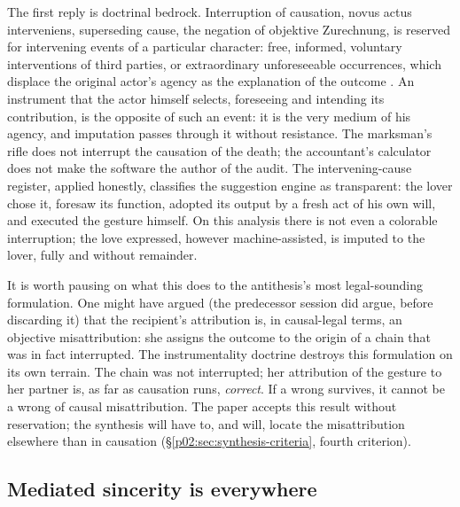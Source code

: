 \documentclass[11pt,a4paper]{article}
\begin{document}
The first reply is doctrinal bedrock. Interruption of causation, novus actus interveniens, superseding cause, the negation of objektive Zurechnung, is reserved for intervening events of a particular character: free, informed, voluntary interventions of third parties, or extraordinary unforeseeable occurrences, which displace the original actor's agency as the explanation of the outcome \parencite{hart1985causation,roxin2006strafrecht}. An instrument that the actor himself selects, foreseeing and intending its contribution, is the opposite of such an event: it is the very medium of his agency, and imputation passes through it without resistance. The marksman's rifle does not interrupt the causation of the death; the accountant's calculator does not make the software the author of the audit. The intervening-cause register, applied honestly, classifies the suggestion engine as transparent: the lover chose it, foresaw its function, adopted its output by a fresh act of his own will, and executed the gesture himself. On this analysis there is not even a colorable interruption; the love expressed, however machine-assisted, is imputed to the lover, fully and without remainder.

It is worth pausing on what this does to the antithesis's most legal-sounding formulation. One might have argued (the predecessor session did argue, before discarding it) that the recipient's attribution is, in causal-legal terms, an objective misattribution: she assigns the outcome to the origin of a chain that was in fact interrupted. The instrumentality doctrine destroys this formulation on its own terrain. The chain was not interrupted; her attribution of the gesture to her partner is, as far as causation runs, \emph{correct}. If a wrong survives, it cannot be a wrong of causal misattribution. The paper accepts this result without reservation; the synthesis will have to, and will, locate the misattribution elsewhere than in causation (\S\ref{p02:sec:synthesis-criteria}, fourth criterion).

\subsection{Mediated sincerity is everywhere}
\label{p02:sec:thesis-mediated}
\end{document}
